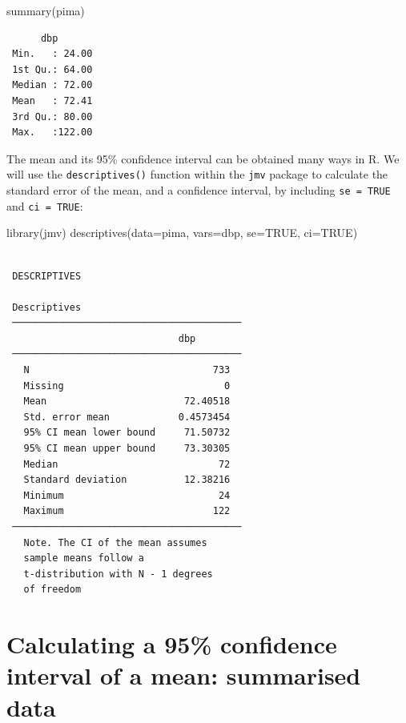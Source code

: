 \documentclass[
  a4paper,
]{memoir}
\newenvironment{Shaded}{\begin{snugshade}}{\end{snugshade}}
\newcommand{\AttributeTok}[1]{\textcolor[rgb]{0.00,0.00,0.00}{#1}}
\newcommand{\ConstantTok}[1]{\textcolor[rgb]{0.00,0.00,0.00}{#1}}
\newcommand{\FunctionTok}[1]{\textcolor[rgb]{0.00,0.00,0.00}{#1}}
\newcommand{\NormalTok}[1]{\textcolor[rgb]{0.00,0.00,0.00}{#1}}
\begin{document}
\begin{Shaded}
\begin{Highlighting}[]
\FunctionTok{summary}\NormalTok{(pima)}
\end{Highlighting}
\end{Shaded}

\begin{verbatim}
      dbp        
 Min.   : 24.00  
 1st Qu.: 64.00  
 Median : 72.00  
 Mean   : 72.41  
 3rd Qu.: 80.00  
 Max.   :122.00  
\end{verbatim}

The mean and its 95\% confidence interval can be obtained many ways in
R. We will use the \texttt{descriptives()} function within the
\texttt{jmv} package to calculate the standard error of the mean, and a
confidence interval, by including \texttt{se\ =\ TRUE} and
\texttt{ci\ =\ TRUE}:

\begin{Shaded}
\begin{Highlighting}[]
\FunctionTok{library}\NormalTok{(jmv)}
\FunctionTok{descriptives}\NormalTok{(}\AttributeTok{data=}\NormalTok{pima, }\AttributeTok{vars=}\NormalTok{dbp, }\AttributeTok{se=}\ConstantTok{TRUE}\NormalTok{, }\AttributeTok{ci=}\ConstantTok{TRUE}\NormalTok{)}
\end{Highlighting}
\end{Shaded}

\begin{verbatim}

 DESCRIPTIVES

 Descriptives                             
 ──────────────────────────────────────── 
                              dbp         
 ──────────────────────────────────────── 
   N                                733   
   Missing                            0   
   Mean                        72.40518   
   Std. error mean            0.4573454   
   95% CI mean lower bound     71.50732   
   95% CI mean upper bound     73.30305   
   Median                            72   
   Standard deviation          12.38216   
   Minimum                           24   
   Maximum                          122   
 ──────────────────────────────────────── 
   Note. The CI of the mean assumes
   sample means follow a
   t-distribution with N - 1 degrees
   of freedom
\end{verbatim}

\section{Calculating a 95\% confidence interval of a mean: summarised
data}\label{sec-cimean-r-summ}
\end{document}
